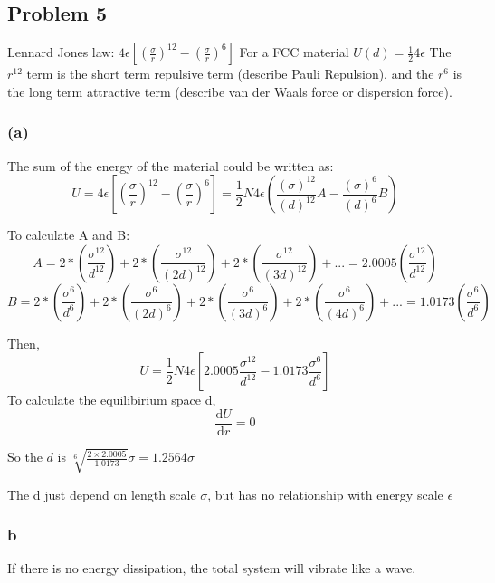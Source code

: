 \documentclass[a4paper]{article}
\begin{document}
\subsection{Problem 5}
Lennard Jones law: $4 \epsilon [(\frac{\sigma}{r})^{12}-(\frac{\sigma}{r})^{6}]$
For a FCC material $U(d)=\frac{1}{2} 4 \epsilon $
\newline
The $r^{12}$ term is the short term repulsive term (describe Pauli Repulsion), and the $r^{6}$ is the long term attractive term (describe van der Waals force or dispersion force).

\subsubsection{(a)}
The sum of the energy of the material could be written as: 
\begin{equation}
	U=4\epsilon [(\frac{\sigma}{r})^{12}-(\frac{\sigma}{r})^{6}]=\frac{1}{2}N 4\epsilon (\frac{(\sigma)^{12}}{(d)^{12}}A-\frac{(\sigma)^{6}}{(d)^{6}}B)
\end{equation}

To calculate A and B:
\begin{equation}
	A=2*(\frac{\sigma^{12}}{d^{12}}) + 2*(\frac{\sigma^{12}}{(2d)^{12}}) + 2*(\frac{\sigma^{12}}{(3d)^{12}})+...=2.0005 (\frac{\sigma^{12}}{d^{12}})
\end{equation}
\begin{equation}
	B=2*(\frac{\sigma^{6}}{d^{6}}) + 2*(\frac{\sigma^{6}}{(2d)^{6}}) + 2*(\frac{\sigma^{6}}{(3d)^{6}})+2*(\frac{\sigma^{6}}{(4d)^{6}})+... = 1.0173 (\frac{\sigma^{6}}{d^{6}})
\end{equation}

Then,
\begin{equation}
	U=\frac{1}{2}N 4 \epsilon [2.0005 \frac{\sigma^12}{d^12}-1.0173 \frac{\sigma^6}{d^6}]
\end{equation}
To calculate the equilibirium space d, 
\begin{equation}
	\frac{\mathrm{d} U}{\mathrm{d}r}=0
\end{equation}

So the $d$ is $\sqrt[6]{\frac{2 \times 2.0005}{1.0173}} \sigma=1.2564 \sigma$

The d just depend on length scale $\sigma$, but has no relationship with energy scale $\epsilon$

\subsubsection{b}
If there is no energy dissipation, the total system will vibrate like a wave. 
\end{document}
